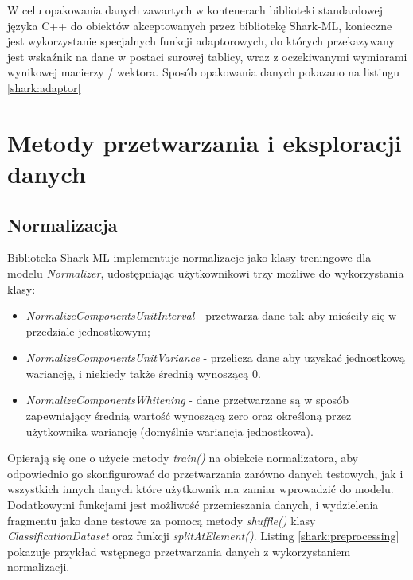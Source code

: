 \newpage
{}

W celu opakowania danych zawartych w kontenerach biblioteki standardowej języka C++ do obiektów akceptowanych przez bibliotekę Shark-ML, konieczne jest wykorzystanie specjalnych funkcji adaptorowych, do których przekazywany jest wskaźnik na dane w postaci surowej tablicy, wraz z oczekiwanymi wymiarami wynikowej macierzy / wektora. Sposób opakowania danych pokazano na listingu \ref{shark:adaptor}


\section{Metody przetwarzania i eksploracji danych}

\subsection{Normalizacja}

Biblioteka Shark-ML implementuje normalizacje jako klasy treningowe dla modelu \textit{Normalizer}, udostępniając użytkownikowi trzy możliwe do wykorzystania klasy:

\begin{itemize}
	\item \textit{NormalizeComponentsUnitInterval} - przetwarza dane tak aby mieściły się w przedziale jednostkowym;
	\item \textit{NormalizeComponentsUnitVariance} - przelicza dane aby uzyskać jednostkową wariancję, i niekiedy także średnią wynoszącą 0.
	\item \textit{NormalizeComponentsWhitening} - dane przetwarzane są w sposób zapewniający średnią wartość wynoszącą zero oraz określoną przez użytkownika wariancję (domyślnie wariancja jednostkowa).
\end{itemize}

Opierają się one o użycie metody \textit{train()} na obiekcie normalizatora, aby odpowiednio go skonfigurować do przetwarzania zarówno danych testowych, jak i wszystkich innych danych które użytkownik ma zamiar wprowadzić do modelu. Dodatkowymi funkcjami jest możliwość przemieszania danych, i wydzielenia fragmentu jako dane testowe za pomocą metody \textit{shuffle()} klasy \textit{ClassificationDataset} oraz funkcji \textit{splitAtElement()}. Listing \ref{shark:preprocessing} pokazuje przykład wstępnego przetwarzania danych z wykorzystaniem normalizacji.

